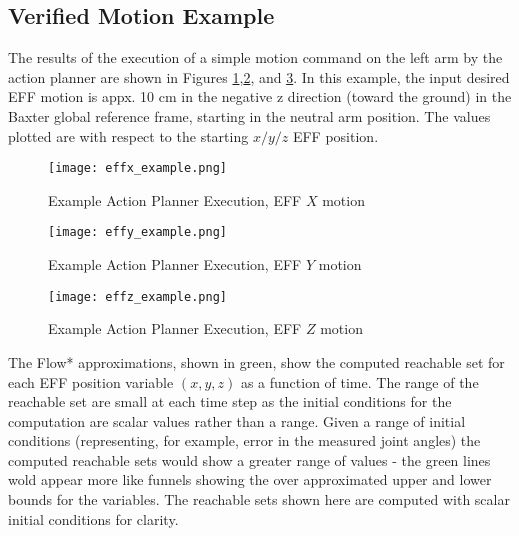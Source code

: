 \subsection{Verified Motion Example}
The results of the execution of a simple motion command on the left arm by the action planner are shown in Figures \ref{fig:effX},\ref{fig:effY}, and \ref{fig:effZ}.
In this example, the input desired EFF motion is appx. 10 cm in the negative z direction (toward the ground) in the Baxter global reference frame, starting in the neutral arm position.
The values plotted are with respect to the starting $x/y/z$ EFF position.

\begin{figure}[h]
	\texttt{[image: effx\_example.png]}
	\caption{Example Action Planner Execution, EFF $X$ motion}
	\label{fig:effX}
\end{figure}

\begin{figure}[h]
	\texttt{[image: effy\_example.png]}
	\caption{Example Action Planner Execution, EFF $Y$ motion}
	\label{fig:effY}
\end{figure}

\begin{figure}[h]
	\texttt{[image: effz\_example.png]}
	\caption{Example Action Planner Execution, EFF $Z$ motion}
	\label{fig:effZ}
\end{figure}

The Flow* approximations, shown in green, show the computed reachable set for each EFF position variable $(x,y,z)$ as a function of time.
The range of the reachable set are small at each time step as the initial conditions for the computation are scalar values rather than a range.
Given a range of initial conditions (representing, for example, error in the measured joint angles) the computed reachable sets would show a greater range of values - the green lines wold appear more like funnels showing the over approximated upper and lower bounds for the variables.
The reachable sets shown here are computed with scalar initial conditions for clarity.

